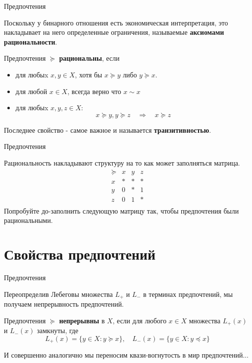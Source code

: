 \documentclass{beamer}
\begin{document}
\begin{frame}{Предпочтения}

Поскольку у бинарного отношения есть экономическая интерпретация, это накладывает на него определенные ограничения, называемые \textbf{аксиомами рациональности}.

\begin{definition}
Предпочтения $\succcurlyeq$	\textbf{рациональны}, если
\begin{itemize}
\item для любыx $x, y \in X$, хотя бы $x \succcurlyeq y$ либо $y \succcurlyeq x$.
\item для любой $x \in X$, всегда верно что $x \sim x$
\item для любыx $x, y, z \in X$: 
$$x \succcurlyeq y, y \succcurlyeq z \quad \Rightarrow \quad x \succcurlyeq z$$
\end{itemize}
\end{definition}
Последнее свойство - самое важное и называется \textbf{транзитивностью}. 

\end{frame}

\begin{frame}{Предпочтения}

Рациональность накладывают структуру на то как может заполняться матрица. 
$$ 
\begin{array}{c|ccc}
 \succcurlyeq & x & y & z\\
\hline
x & * & * & * \\
y & 0 & * & 1\\
z & 0 & 1 & *\\
\end{array}
$$
Попробуйте до-заполнить следующую матрицу так, чтобы предпочтения были рациональными.

\end{frame}

\section{Свойства предпочтений}

\begin{frame}{Предпочтения}

Переопределив Лебеговы множества $L_{+}$ и $L_{-}$ в терминах предпочтений, мы получаем непрерывность предпочтений.

\begin{definition}
Предпочтения $\succcurlyeq$ \textbf{непрерывны} в $X$, если для любого $x \in X$ множества $L_{+}(x)$ и $L_{-}(x)$ замкнуты, где
$$L_{+}(x) = \{y \in X: y \succcurlyeq x\}, \quad L_{-}(x) = \{y \in X: y \preccurlyeq x\}$$
\end{definition}

И совершенно аналогично мы переносим квази-вогнутость в мир предпочтений...

\end{frame}
\end{document}

